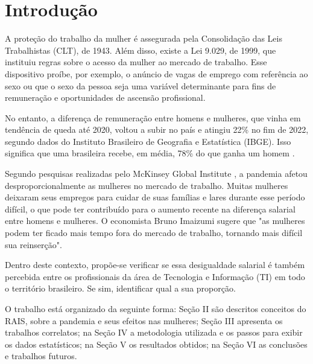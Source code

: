 \section{Introdução}

A proteção do trabalho da mulher é assegurada pela Consolidação das Leis Trabalhistas (CLT), de 1943. Além disso, existe a Lei 9.029, de 1999, que instituiu regras sobre o acesso da mulher ao mercado de trabalho. Esse dispositivo proíbe, por exemplo, o anúncio de vagas de emprego com referência ao sexo ou que o sexo da pessoa seja uma variável determinante para fins de remuneração e oportunidades de ascensão profissional. 

No entanto, a diferença de remuneração entre homens e mulheres, que vinha em tendência de queda até 2020, voltou a subir no país e atingiu 22\% no fim de 2022, segundo dados do Instituto Brasileiro de Geografia e Estatística (IBGE). Isso significa que uma brasileira recebe, em média, 78\% do que ganha um homem \cite{dif_salarial_CNN}.

Segundo pesquisas realizadas pelo McKinsey Global Institute  \cite{covid_affeted_gender}, a pandemia afetou desproporcionalmente as mulheres no mercado de trabalho. Muitas mulheres deixaram seus empregos para cuidar de suas famílias e lares durante esse período difícil, o que pode ter contribuído para o aumento recente na diferença salarial entre homens e mulheres. O economista Bruno Imaizumi sugere que "as mulheres podem ter ficado mais tempo fora do mercado de trabalho, tornando mais difícil sua reinserção".

Dentro deste contexto, propõe-se verificar se essa desigualdade salarial é também percebida entre os profissionais da área de Tecnologia e Informação (TI) em todo o território brasileiro. Se sim, identificar qual a sua proporção.

O trabalho está organizado da seguinte forma: Seção II são descritos conceitos do RAIS, sobre a pandemia e seus efeitos nas mulheres; Seção III apresenta os trabalhos correlatos; na Seção IV a metodologia utilizada e os passos para exibir os dados estatísticos; na Seção V os resultados obtidos; na Seção VI as conclusões e trabalhos futuros.